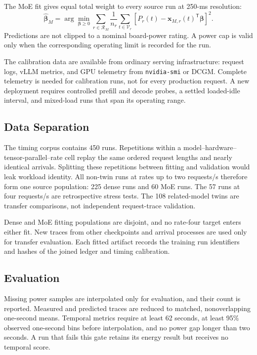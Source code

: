 The MoE fit gives equal total weight to every source run at 250-ms resolution:
\begin{equation}
  \widehat{\boldsymbol\beta}_{M}=
  \arg\min_{\boldsymbol\beta\ge0}
  \sum_{r\in\mathcal R_M}\frac{1}{n_r}
  \sum_{t\in\mathcal V_r}
  \left[P_r(t)-\mathbf{x}_{M,r}(t)^\mathsf T
  \boldsymbol\beta\right]^2.
  \label{eq:moe-objective}
\end{equation}
Predictions are not clipped to a nominal board-power rating.  A power cap is
valid only when the corresponding operating limit is recorded for the run.

The calibration data are available from ordinary serving infrastructure:
request logs, vLLM metrics, and GPU telemetry from \texttt{nvidia-smi} or
DCGM.  Complete telemetry is needed for calibration runs, not for every
production request.  A new deployment requires controlled prefill and decode
probes, a settled loaded-idle interval, and mixed-load runs that span its
operating range.

\subsection{Data Separation}
\label{sec:data-splits}

The timing corpus contains 450 runs.  Repetitions within a
model--hardware--tensor-parallel--rate cell replay the same ordered request
lengths and nearly identical arrivals.  Splitting these repetitions between
fitting and validation would leak workload identity.  All non-twin runs at
rates up to two requests/s therefore form one source population: 225 dense
runs and 60 MoE runs.  The 57 runs at four requests/s are retrospective stress
tests.  The 108 related-model twins are transfer comparisons, not independent
request-trace validation.

Dense and MoE fitting populations are disjoint, and no rate-four target enters
either fit.  New traces from other checkpoints and arrival processes are used
only for transfer evaluation.  Each fitted artifact records the training run
identifiers and hashes of the joined ledger and timing calibration.

\subsection{Evaluation}
\label{sec:power-metrics}

Missing power samples are interpolated only for evaluation, and their count is
reported.  Measured and predicted traces are reduced to matched,
nonoverlapping one-second means.  Temporal metrics require at least 62 seconds,
at least 95\% observed one-second bins before interpolation, and no power gap
longer than two seconds.  A run that fails this gate retains its energy result
but receives no temporal score.

